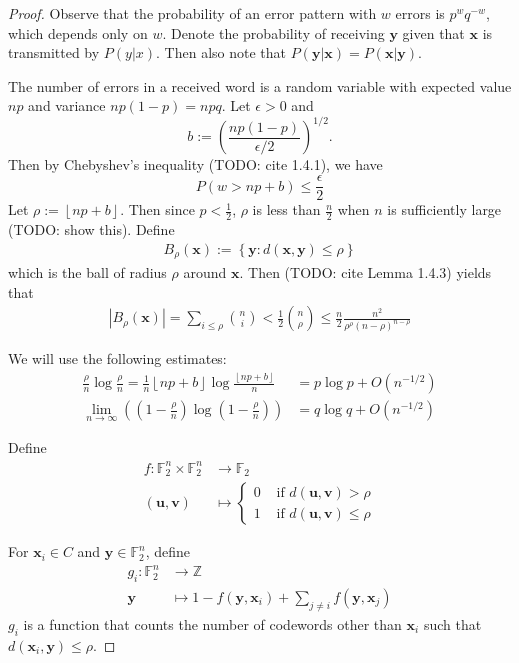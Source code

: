 \documentclass{article}
\renewcommand{\tt}[1]{\text{ #1 }}
\newcommand{\Z}{\mathbb{Z}}
\newcommand{\F}{\mathbb{F}}
\newcommand{\mt}{\mapsto}
\newcommand{\floor}[1]{\left\lfloor #1 \right\rfloor}
\renewcommand{\=}{\equiv}
\newcommand{\ra}{\rightarrow}
\newcommand{\ass}[1]{\left( #1 \right)}
\newcommand{\set}[1]{\left\{ #1 \right\}}
\renewcommand{\v}{\mathbf}
\newcommand{\x}{{\v x}}
\newcommand{\y}{{\v y}}
\theoremstyle{plain}
\theoremstyle{definition}
\newcommand{\TODO}[1]{(TODO: #1)}
\begin{document}
\begin{proof}
Observe that the probability of an error pattern with $w$ errors is $p^w q^{-w}$, which depends only on $w$.
Denote the probability of receiving $\y$ given that $\x$ is transmitted by $P(y|x)$.
Then also note that $P(\y|\x) = P(\x|\y)$.

The number of errors in a received word is a random variable with expected value $np$ and variance $np(1-p) = npq$.
Let $\epsilon > 0$ and
$$ b := \ass{\frac{np(1-p)}{\epsilon/2}}^{1/2}. $$
Then by Chebyshev's inequality \TODO{cite 1.4.1}, we have
\begin{equation} \label{eq:cheby}
  P(w > np + b) \leq \frac{\epsilon}{2}
\end{equation}
Let $\rho := \floor{np + b}$.
Then since $p < \frac 1 2$, $\rho$ is less than $\frac{n}{2}$ when $n$ is sufficiently large \TODO{show this}.
Define
\begin{align}
  B_\rho(\x) := \set{ \y : d(\x, \y) \leq \rho }
\end{align}
which is the ball of radius $\rho$ around $\v x$.
Then \TODO{cite Lemma 1.4.3} yields that
\begin{align}
  |B_\rho(\x)| = \sum_{i \leq \rho} \binom{n}{i} < \frac{1}{2} \binom{n}{\rho} \leq \frac{n}{2} \frac{n^2}{\rho^\rho(n - \rho)^{n - \rho}}
\end{align}

We will use the following estimates:
\begin{align} \label{eq:estimates}
  \frac{\rho}{n} \log \frac{\rho}{n} = \frac{1}{n} \floor{np + b} \log \frac{\floor{np + b}}{n}
  &= p \log p + O(n^{-1/2}) \\
  \lim_{n \ra \infty} \ass{\ass{1 - \frac{\rho}{n}} \log \ass{1 - \frac{\rho}{n}}}
  &= q \log q + O(n^{-1/2})
\end{align}

Define
\begin{align}
  f :
  \F_2^n \times \F_2^n &\ra \F_2 \\
  (\v u, \v v) &\mt \begin{cases}
    0 &\tt{if} d(\v u, \v v) > \rho \\
    1 &\tt{if} d(\v u, \v v) \leq \rho
  \end{cases}
\end{align}

For $\x_i \in C$ and $\y \in \F_2^n$, define
\begin{align*}
  g_i :
  \F_2^n &\ra \Z \\
  \y &\mt 1 - f(\y, \x_i) + \sum_{j \neq i} f(\v y, \x_j)
\end{align*}
$g_i$ is a function that counts the number of codewords other than $\x_i$ such that $d(\x_i, \y) \leq \rho$.


\end{proof}
\end{document}
